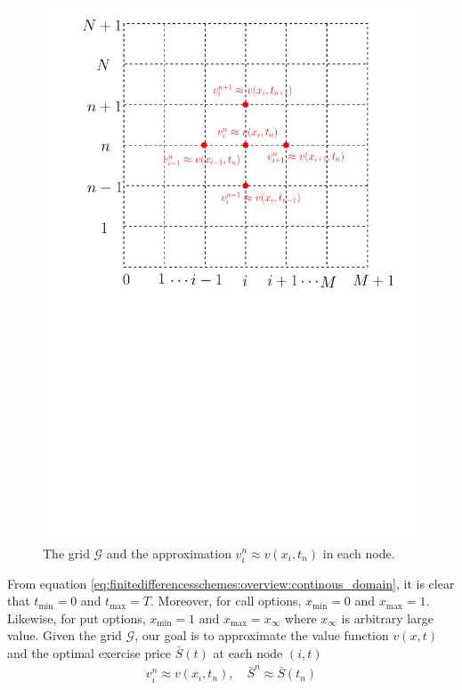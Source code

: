 \begin{figure}[H]
  \label{fig:finitedifferencesschemes:overview:grid}
  \centering
  \includegraphics[scale=0.5]{chapters/chapter3/GridAproximation.pdf}
  \caption{The grid $\mathcal{G}$ and the approximation $v^{n}_{i} \approx v(x_i, t_n)$ in each node.}
\end{figure}
From equation \eqref{eq:finitedifferencesschemes:overview:continous_domain}, it is clear that $t_\text{min} = 0$ and $t_\text{max}=T$. Moreover, for call options, $x_\text{min} = 0$ and $x_\text{max}=1$. Likewise, for put options, $x_\text{min}=1$ and $x_\text{max}=x_\infty$ where $x_\infty$ is arbitrary large value. Given the grid $\mathcal{G}$, our goal is to approximate the value function $v(x, t)$ and the optimal exercise price $\bar{S}(t)$ at each node $(i, t)$
\begin{align*}
  v^{n}_i \approx v(x_i,t_n), \quad \bar{S}^{n} \approx \bar{S}(t_n)
\end{align*}
